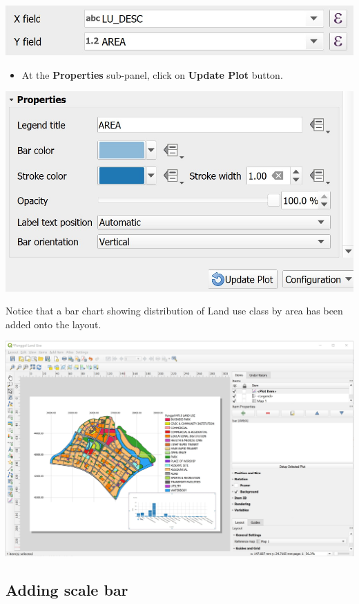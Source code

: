 \documentclass[
  letterpaper,
  DIV=11,
  numbers=noendperiod]{scrreprt}
\providecommand{\tightlist}{%
  \setlength{\itemsep}{0pt}\setlength{\parskip}{0pt}}\usepackage{longtable,booktabs,array}
\begin{document}
\includegraphics{./img04/image70.jpg}

\begin{itemize}
\tightlist
\item
  At the \textbf{Properties} sub-panel, click on \textbf{Update Plot}
  button.
\end{itemize}

\includegraphics{./img04/image71.jpg}

Notice that a bar chart showing distribution of Land use class by area
has been added onto the layout.

\includegraphics{./img04/image72.jpg}

\hypertarget{adding-scale-bar}{%
\subsection{Adding scale bar}\label{adding-scale-bar}}
\end{document}
